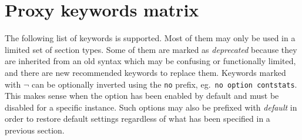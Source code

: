 
\section{Proxy keywords matrix}

\newcommand{\NO}{$\circ$}
\newcommand{\YES}{$\bullet$}
\newcommand{\optnopr}{ $\neg$}
\newcommand{\deprecated}[1]{\textsl{{\color{gray}#1}}}
\newcommand{\depword}[1]{\texttt{\deprecated{#1}}}

The following list of keywords is supported. Most of them may only be used in a
limited set of section types. Some of them are marked as \deprecated{deprecated} because
they are inherited from an old syntax which may be confusing or functionally
limited, and there are new recommended keywords to replace them. Keywords
marked with\optnopr{} can be optionally inverted using the \texttt{no} prefix,
eg.~\texttt{no option contstats}. This makes sense when the option has been enabled by default
and must be disabled for a specific instance. Such options may also be prefixed
with \emph{default} in order to restore default settings regardless of what has been
specified in a previous  section.


